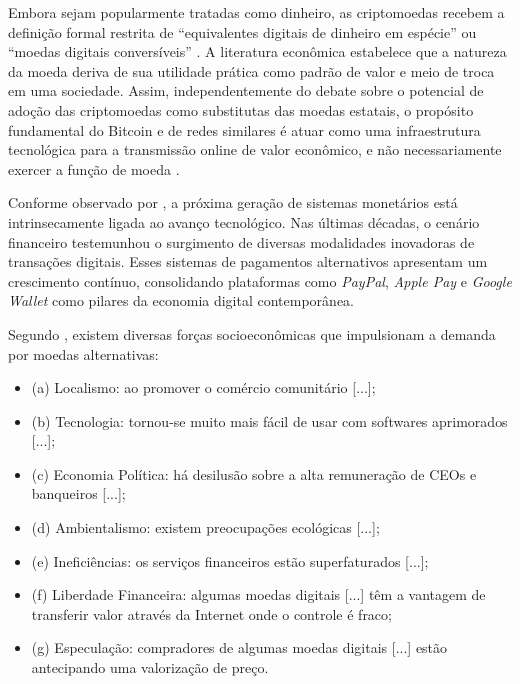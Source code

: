 \documentclass[
    12pt,                %
    openright,           %
    oneside,             %
    a4paper,             %
    english,             %
    brazil               %
]{abntex2}
\begin{document}
Embora sejam popularmente tratadas como dinheiro, as criptomoedas recebem a definição formal restrita de 
``equivalentes digitais de dinheiro em espécie'' ou ``moedas digitais conversíveis'' \cite{papadopoulos2024blockchain}.  
A literatura econômica estabelece que a natureza da moeda deriva de sua utilidade prática como padrão de valor e meio 
de troca em uma sociedade. Assim, independentemente do debate sobre o potencial de adoção das criptomoedas como 
substitutas das moedas estatais, o propósito fundamental do Bitcoin e de redes similares é atuar como uma infraestrutura 
tecnológica para a transmissão online de valor econômico, e não necessariamente 
exercer a função de moeda \cite{papadopoulos2024blockchain}.

Conforme observado por , a próxima geração de sistemas monetários está intrinsecamente ligada ao avanço tecnológico. Nas últimas décadas, 
o cenário financeiro testemunhou o surgimento de diversas modalidades inovadoras de transações digitais. Esses sistemas de pagamentos alternativos apresentam 
um crescimento contínuo, consolidando plataformas como \textit{PayPal}, \textit{Apple Pay} e \textit{Google Wallet} como pilares da economia digital contemporânea.

Segundo , existem diversas forças socioeconômicas que impulsionam a demanda por moedas alternativas:
\begin{citacao}
    \begin{itemize}
        \item (a) Localismo: ao promover o comércio comunitário [...]; 
	    \item (b) Tecnologia: tornou-se muito mais fácil de usar com softwares aprimorados [...]; 
	    \item (c) Economia Política: há desilusão sobre a alta remuneração de CEOs e banqueiros [...]; 
	    \item (d) Ambientalismo: existem preocupações ecológicas [...]; 
        \item (e) Ineficiências: os serviços financeiros estão superfaturados [...];
	    \item (f) Liberdade Financeira: algumas moedas digitais [...] têm a vantagem de transferir valor através da Internet onde o controle é fraco; 
	    \item (g) Especulação: compradores de algumas moedas digitais [...] estão antecipando uma valorização de preço. \cite[p. 4-5]{CHUEN}  
    \end{itemize}
\end{citacao}
\end{document}
